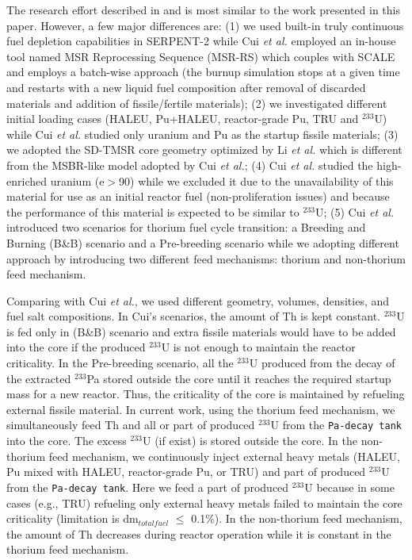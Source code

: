 The research effort described in \cite{cui2017transition} and
\cite{cui2018possible} is most similar to the work
presented in this paper. However, a few major differences
are: (1) we used built-in truly continuous fuel depletion capabilities in
SERPENT-2 \cite{aufiero2013extended} while Cui \emph{et al.} employed an in-house tool named MSR
Reprocessing Sequence (MSR-RS) \cite{ZOU2015114} which couples with SCALE and employs a batch-wise approach (the burnup simulation stops at a given time and restarts with a new liquid fuel composition after removal of discarded materials and addition of fissile/fertile materials); (2) we investigated different initial loading cases (HALEU, Pu+HALEU, reactor-grade Pu, TRU and $^{233}$U) while Cui \emph{et al.} studied only uranium and Pu as the startup fissile materials; (3) we adopted the SD-TMSR core geometry optimized by Li \emph{et al.} \cite{li_optimization_2018} which is different from the MSBR-like model adopted by Cui \emph{et al.}; (4) Cui \emph{et al.} studied the high-enriched uranium (e$>$90) while we excluded it due to the unavailability of this material for use as an initial reactor fuel (non-proliferation issues) and because the performance of this material is expected to be similar to $^{233}$U; (5) Cui \emph{et al.} introduced two scenarios for thorium fuel cycle transition: a Breeding and Burning (B\&B) scenario and a Pre-breeding scenario while we adopting different approach by introducing two different feed mechanisms: thorium and non-thorium feed mechanism.

Comparing with Cui \emph{et al.}, we used different geometry, volumes, densities, and fuel salt compositions. In Cui's scenarios, the amount of Th is kept constant. $^{233}$U is fed only in (B\&B) scenario and extra fissile materials would have to be added into the core if the produced $^{233}$U is not enough to maintain the reactor criticality. In the Pre-breeding scenario, all the $^{233}$U produced from the decay of the extracted $^{233}$Pa stored outside the core until it reaches the required startup mass for a new reactor. Thus, the criticality of the core is maintained by refueling external fissile material. 
In current work, using the thorium feed mechanism, we simultaneously feed Th and all or part of produced $^{233}$U from the \texttt{Pa-decay tank} into the core. The excess $^{233}$U (if exist) is stored outside the core. In the non-thorium feed mechanism, we continuously inject external heavy metals (HALEU, Pu mixed with HALEU, reactor-grade Pu, or TRU) and part of produced $^{233}$U from the \texttt{Pa-decay tank}. Here we feed a part of produced $^{233}$U because in some cases (e.g., TRU) refueling only external heavy metals failed to maintain the core criticality (limitation is dm$_{total fuel}$ $\leq$ 0.1\%). In the non-thorium feed mechanism, the amount of Th decreases during reactor operation while it is constant in the thorium feed mechanism.

